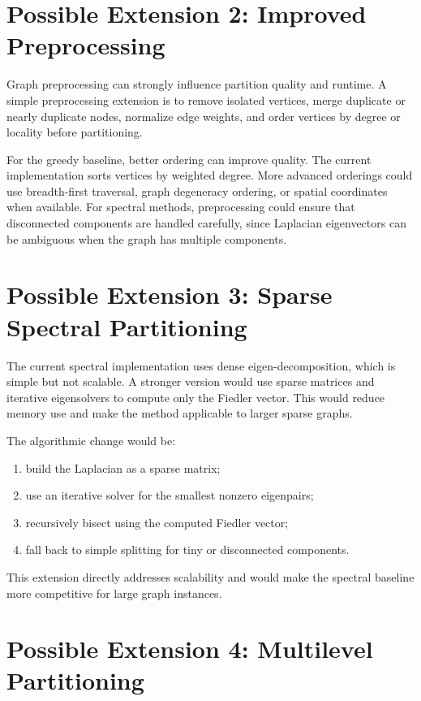 \documentclass[11pt]{article}
\begin{document}
\section{Possible Extension 2: Improved Preprocessing}

Graph preprocessing can strongly influence partition quality and runtime. A
simple preprocessing extension is to remove isolated vertices, merge duplicate
or nearly duplicate nodes, normalize edge weights, and order vertices by
degree or locality before partitioning.

For the greedy baseline, better ordering can improve quality. The current
implementation sorts vertices by weighted degree. More advanced orderings
could use breadth-first traversal, graph degeneracy ordering, or spatial
coordinates when available. For spectral methods, preprocessing could ensure
that disconnected components are handled carefully, since Laplacian eigenvectors
can be ambiguous when the graph has multiple components.

\section{Possible Extension 3: Sparse Spectral Partitioning}

The current spectral implementation uses dense eigen-decomposition, which is
simple but not scalable. A stronger version would use sparse matrices and
iterative eigensolvers to compute only the Fiedler vector. This would reduce
memory use and make the method applicable to larger sparse graphs.

The algorithmic change would be:
\begin{enumerate}
    \item build the Laplacian as a sparse matrix;
    \item use an iterative solver for the smallest nonzero eigenpairs;
    \item recursively bisect using the computed Fiedler vector;
    \item fall back to simple splitting for tiny or disconnected components.
\end{enumerate}

This extension directly addresses scalability and would make the spectral
baseline more competitive for large graph instances.

\section{Possible Extension 4: Multilevel Partitioning}
\end{document}
